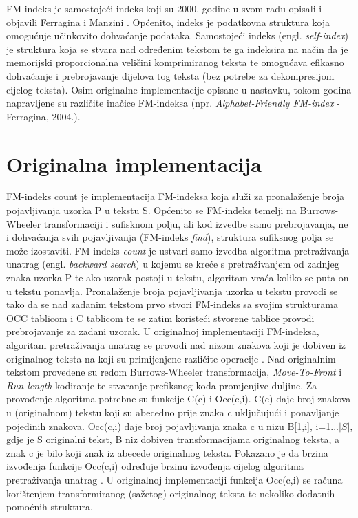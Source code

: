 FM-indeks je samostojeći indeks koji su 2000. godine u svom radu opisali i objavili Ferragina i Manzini \cite{fm1}. Općenito, indeks je podatkovna struktura koja omogućuje učinkovito dohvaćanje podataka. Samostojeći indeks (engl. \emph{self-index}) je struktura koja se stvara nad određenim tekstom te ga indeksira na način da je memorijski proporcionalna veličini komprimiranog teksta te omogućava efikasno dohvaćanje i prebrojavanje dijelova tog teksta (bez potrebe za dekompresijom cijelog teksta).
Osim originalne implementacije opisane u nastavku, tokom godina napravljene su različite inačice FM-indeksa (npr. \emph{Alphabet-Friendly FM-index} - Ferragina, 2004.).

\section{Originalna implementacija}
FM-indeks count je implementacija FM-indeksa koja služi za pronalaženje broja pojavljivanja uzorka P u tekstu S. Općenito se FM-indeks temelji na Burrows-Wheeler transformaciji i sufisknom polju, ali kod izvedbe samo prebrojavanja, ne i dohvaćanja svih pojavljivanja (FM-indeks \emph{find}), struktura sufiksnog polja se može izostaviti.
FM-indeks \emph{count} je ustvari samo izvedba algoritma pretraživanja unatrag  (engl. \emph{backward search}) u kojemu se kreće s pretraživanjem od zadnjeg znaka uzorka P te ako uzorak postoji u tekstu, algoritam vraća koliko se puta on u tekstu ponavlja.
Pronalaženje broja pojavljivanja uzorka u tekstu provodi se tako da se nad zadanim tekstom prvo stvori FM-indeks sa svojim strukturama OCC tablicom i C tablicom te se zatim koristeći stvorene tablice provodi prebrojavanje za zadani uzorak.
U originalnoj implementaciji FM-indeksa, algoritam pretraživanja unatrag se provodi nad nizom znakova koji je dobiven iz originalnog teksta na koji su primijenjene različite operacije \cite{fm1}. Nad originalnim tekstom provedene su redom Burrows-Wheeler transformacija, \emph{Move-To-Front} i \emph{Run-length} kodiranje te stvaranje prefiksnog koda promjenjive duljine.  Za provođenje algoritma potrebne su funkcije C(c) i Occ(c,i). C(c) daje broj znakova u (originalnom) tekstu koji su abecedno prije znaka c uključujući i ponavljanje pojedinih znakova. Occ(c,i) daje broj pojavljivanja znaka c u nizu B[1,i], i=1...$|S|$, gdje je S originalni tekst, B niz dobiven transformacijama originalnog teksta, a znak c je bilo koji znak iz abecede originalnog teksta. Pokazano je da brzina izvođenja funkcije Occ(c,i) određuje brzinu izvođenja cijelog algoritma pretraživanja unatrag \cite{fm2}. U originalnoj implementaciji funkcija Occ(c,i) se računa korištenjem transformiranog (sažetog) originalnog teksta te nekoliko dodatnih pomoćnih struktura. 



